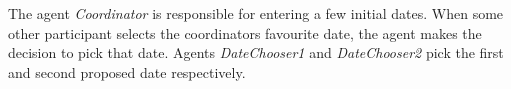 The agent \textit{Coordinator} is responsible for entering a few initial dates. When some other participant selects the coordinators favourite date, the agent makes the decision to pick that date. Agents \textit{DateChooser1} and \textit{DateChooser2} pick the first and second proposed date respectively. 